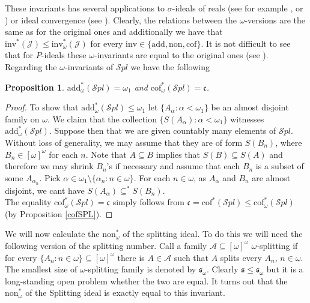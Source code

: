 \documentclass[a4paper]{amsart}
\newtheorem{proposition}[theorem]{Proposition}
\newcommand{\sss}{\mathfrak{s}}
\newcommand{\continuum}{\mathfrak{c}}
\newcommand{\add}{\mathrm{add}}
\newcommand{\cof}{\mathrm{cof}}
\newcommand{\non}{\mathrm{non}}
\newcommand{\J}{\mathcal{J}}
\newcommand{\SPL}{\mathcal{S}pl}
\begin{document}
    These invariants has several applications to $\sigma$-ideals of reals (see for example \cite{BS99}, \cite{CIESGAPPOYAMAZOEMARTINEZ} or \cite{CIESMARTINEZ}) or ideal convergence (see \cite{FilipowKwela}). Clearly, the relations between the $\omega$-versions are the same as for the original ones and additionally we have that $\mathrm{inv}^{*}(\J)\leq\mathrm{inv}_{\omega}^{*}(\J)$ for every $\mathrm{inv}\in\{\add,\non,\cof\}$. It is not difficult to see that for $P$-ideals these $\omega$-invariants are equal to the original ones (see \cite{CIESMARTINEZ}).\\
    Regarding the $\omega$-invariants of $\SPL$ we have the following
    \begin{proposition}
        $\add_{\omega}^{*}(\SPL)=\omega_{1}$ and $\cof_{\omega}^{*}(\SPL)=\continuum$.
    \end{proposition}
    \begin{proof}
        To show that $\add_{\omega}^{*}(\SPL)\leq\omega_{1}$ let $\{A_{\alpha}:\alpha<\omega_{1}\}$ be an almost disjoint family on $\omega$. We claim that the collection $\{S(A_{\alpha}):\alpha<\omega_{1}\}$ witnesses $\add_{\omega}^{*}(\SPL)$. Suppose then that we are given countably many elements of $\SPL$. Without loss of generality, we may assume that they are of form $S(B_{n})$, where $B_{n}\in[\omega]^{\omega}$ for each $n$. Note that $A\subseteq B$ implies that $S(B)\subseteq S(A)$ and therefore we may shrink $B_{n}$'s if necessary and assume that each $B_{n}$ is a subset of some $A_{\alpha_{n}}$. Pick $\alpha\in\omega_{1}\setminus\{\alpha_{n}:n\in\omega\}$. For each $n\in\omega$, as $A_{\alpha}$ and $B_{n}$ are almost disjoint, we cant have $S(A_{\alpha})\subseteq^{*}S(B_{n})$.\\
        The equality $\cof_{\omega}^{*}(\SPL)=\continuum$ simply follows from $\continuum=\cof^{*}(\SPL)\leq\cof^{*}_{\omega}(\SPL)$ (by Proposition \ref{cofSPL}).
    \end{proof}
    We will now calculate the $\non^{*}_{\omega}$ of the splitting ideal. To do this we will need the following version of the splitting number. Call a family $\mathcal{A}\subseteq[\omega]^{\omega}$ $\omega$-splitting if for every $\{A_{n}:n\in\omega\}\subseteq[\omega]^{\omega}$ there is $A\in\mathcal{A}$ such that $A$ splits every $A_{n}$, $n\in\omega$. The smallest size of $\omega$-splitting family is denoted by $\sss_{\omega}$. Clearly $\sss\leq\sss_{\omega}$ but it is a long-standing open problem whether the two are equal.
    It turns out that the $\non^{*}_{\omega}$ of the Splitting ideal is exactly equal to this invariant.
\end{document}
